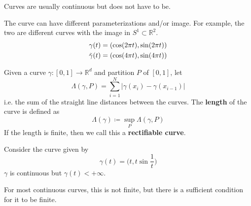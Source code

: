   Curves are usually continuous but does not have to be. 

  \begin{example}
    \label{ex:different-parameterizations-of-a-curve}
    The curve can have different parameterizations and/or image. For example, the two are different curves with the image in $S^1 \subset \mathbb{R}^2$. 
    \begin{align}
      \gamma(t) & = (\cos(2 \pi t), \sin(2 \pi t)) \\ 
      \Tilde{\gamma}(t) & = (\cos(4 \pi t), \sin(4 \pi t))
    \end{align} 
  \end{example}

  \begin{definition}
    \label{def:length-of-a-curve}
    Given a curve $\gamma: [0, 1] \to \mathbb{R}^d$ and partition $P$ of $[0, 1]$, let 
    \begin{equation}
      \Lambda(\gamma, P) = \sum_{i=1}^N | \gamma(x_i) - \gamma(x_{i-1})| 
    \end{equation}
    i.e. the sum of the straight line distances between the curves. The \textbf{length} of the curve is defined as 
    \begin{equation}
      \Lambda(\gamma) \coloneqq \sup_P \Lambda(\gamma, P)
    \end{equation}
    If the length is finite, then we call this a \textbf{rectifiable curve}. 
  \end{definition}

  \begin{example}
    \label{ex:a-continuous-curve-of-infinite-length}
    Consider the curve given by 
    \begin{equation}
      \gamma(t) = \bigg( t, t \sin \frac{1}{t} \bigg)
    \end{equation}
    $\gamma$ is continuous but $\gamma(t) < +\infty$. 
  \end{example}

  For most continuous curves, this is not finite, but there is a sufficient condition for it to be finite. 


